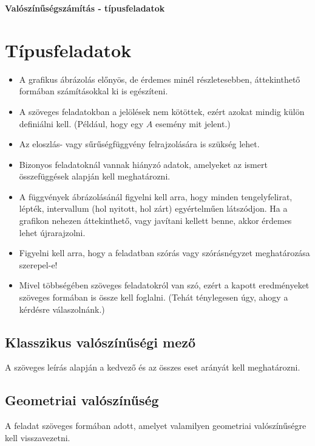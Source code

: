 \documentclass[a4paper]{article}
\begin{document}
\begin{center}
   \large \textbf{Valószínűségszámítás - típusfeladatok}
\end{center}

\vskip 1cm

\section{Típusfeladatok}

\begin{itemize}
\item A grafikus ábrázolás előnyös, de érdemes minél részletesebben, áttekinthető formában számításokkal ki is egészíteni.
\item A szöveges feladatokban a jelölések nem kötöttek, ezért azokat mindig külön definiálni kell. (Például, hogy egy $A$ esemény mit jelent.)
\item Az eloszlás- vagy sűrűségfüggvény felrajzolására is szükség lehet.
\item Bizonyos feladatoknál vannak hiányzó adatok, amelyeket az ismert összefüggések alapján kell meghatározni.
\item A függvények ábrázolásánál figyelni kell arra, hogy minden tengelyfelirat, lépték, intervallum (hol nyitott, hol zárt) egyértelműen látszódjon.
Ha a grafikon nehezen áttekinthető, vagy javítani kellett benne, akkor érdemes lehet újrarajzolni.
\item Figyelni kell arra, hogy a feladatban szórás vagy szórásnégyzet meghatározása szerepel-e!
\item Mivel többségében szöveges feladatokról van szó, ezért a kapott eredményeket szöveges formában is össze kell foglalni. (Tehát ténylegesen úgy, ahogy a kérdésre válaszolnánk.)
\end{itemize}

\subsection{Klasszikus valószínűségi mező}

A szöveges leírás alapján a kedvező és az összes eset arányát kell meghatározni.

\subsection{Geometriai valószínűség}

A feladat szöveges formában adott, amelyet valamilyen geometriai valószínűségre kell visszavezetni.
\end{document}
